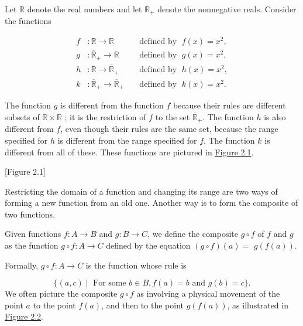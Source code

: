 \begin{centeredblock*}
 \begin{example}
\label{ex:\thesection.\theexample}
 Let \(\mathbb{R}\) denote the real numbers and let \({\bar{\mathbb{R}}}_{+}\) denote the nonnegative reals. Consider the functions

 \[
 \begin{aligned}
 f &: \mathbb{R} \rightarrow \mathbb{R}\; &&\text{defined by }\; f(x) = x^{2}, \\
 g &: {\overline{\mathbb{R}}}_{+} \rightarrow \mathbb{R}\; &&\text{defined by }\; g(x) = x^{2}, \\
 h &: \mathbb{R} \rightarrow {\overline{\mathbb{R}}}_{+}\; &&\text{defined by }\; h(x) = x^{2}, \\
 k &: {\overline{\mathbb{R}}}_{+} \rightarrow {\overline{\mathbb{R}}}_{+}\; &&\text{defined by }\; k(x) = x^{2}.
 \end{aligned}
 \]

 The function \(g\) is different from the function \(f\) because their rules are different subsets of \(\mathbb{R} \times \mathbb{R}\) ; it is the restriction of \(f\) to the set \({\overline{\mathbb{R}}}_{+}\). The function \(h\) is also different from \(f\), even though their rules are the same set, because the range specified for \(h\) is different from the range specified for \(f\). The function \(k\) is different from all of these. These functions are pictured in \hyperref[fig:2.1]{Figure 2.1}.
 \end{example}
\end{centeredblock*}

[Figure 2.1]

Restricting the domain of a function and changing its range are two ways 
of forming a new function from an old one. Another way is to form 
the composite of two functions.

\begin{definition}
 Given functions \(f : A \rightarrow B\) and \(g : B \rightarrow C\), we define the composite \(g \circ f\) of \(f\) and \(g\) as the function \(g \circ f : A \rightarrow C\) defined by the equation \(({g \circ f}) (a) =\) \(g({f(a) })\).
\end{definition}

Formally, \(g \circ f : A \rightarrow C\) is the function whose rule is

\[
\{ ({a,c}) \mid \text{ For some }b \in B,f(a) = b\text{ and }g(b) = c\}.
\]
We often picture the composite \(g \circ f\) as involving a physical movement 
of the point \(a\) to the point \(f(a)\), and then to the point \(g({f(a) })\), 
as illustrated in \hyperref[fig:2.2]{Figure 2.2}.

